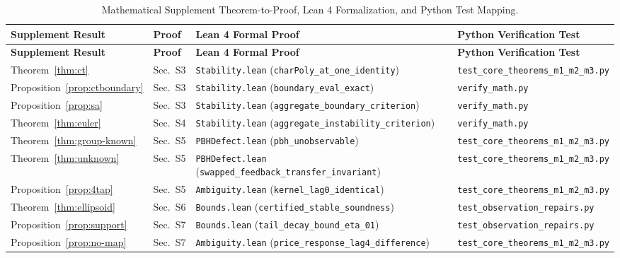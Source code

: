 \documentclass[11pt,a4paper]{article}
\theoremstyle{definition}\newtheorem{definition}[theorem]{Definition}
\theoremstyle{remark}\newtheorem{remark}[theorem]{Remark}
\begin{document}
\begingroup\setlength{\tabcolsep}{3pt}
\begin{longtable}{@{}>{\raggedright\arraybackslash}p{}>{\raggedright\arraybackslash}p{}>{\raggedright\arraybackslash\footnotesize}p{}>{\raggedright\arraybackslash\footnotesize}p{}@{}}
\caption{Mathematical Supplement Theorem-to-Proof, Lean 4 Formalization, and Python Test Mapping.}\label{tab:supp_claim_map}\\
\toprule
\textbf{Supplement Result} & \textbf{Proof} & \textbf{Lean 4 Formal Proof} & \textbf{Python Verification Test} \\\midrule\endfirsthead
\toprule
\textbf{Supplement Result} & \textbf{Proof} & \textbf{Lean 4 Formal Proof} & \textbf{Python Verification Test} \\\midrule\endhead
Theorem~\ref{thm:ct} & Sec.~S3 & \nolinkurl{Stability.lean} (\nolinkurl{charPoly_at_one_identity}) & \nolinkurl{test_core_theorems_m1_m2_m3.py} \\
Proposition~\ref{prop:ctboundary} & Sec.~S3 & \nolinkurl{Stability.lean} (\nolinkurl{boundary_eval_exact}) & \nolinkurl{verify_math.py} \\
Proposition~\ref{prop:sa} & Sec.~S3 & \nolinkurl{Stability.lean} (\nolinkurl{aggregate_boundary_criterion}) & \nolinkurl{verify_math.py} \\
Theorem~\ref{thm:euler} & Sec.~S4 & \nolinkurl{Stability.lean} (\nolinkurl{aggregate_instability_criterion}) & \nolinkurl{verify_math.py} \\
Theorem~\ref{thm:group-known} & Sec.~S5 & \nolinkurl{PBHDefect.lean} (\nolinkurl{pbh_unobservable}) & \nolinkurl{test_core_theorems_m1_m2_m3.py} \\
Theorem~\ref{thm:unknown} & Sec.~S5 & \nolinkurl{PBHDefect.lean} (\nolinkurl{swapped_feedback_transfer_invariant}) & \nolinkurl{test_core_theorems_m1_m2_m3.py} \\
Proposition~\ref{prop:4tap} & Sec.~S5 & \nolinkurl{Ambiguity.lean} (\nolinkurl{kernel_lag0_identical}) & \nolinkurl{test_core_theorems_m1_m2_m3.py} \\
Theorem~\ref{thm:ellipsoid} & Sec.~S6 & \nolinkurl{Bounds.lean} (\nolinkurl{certified_stable_soundness}) & \nolinkurl{test_observation_repairs.py} \\
Proposition~\ref{prop:support} & Sec.~S7 & \nolinkurl{Bounds.lean} (\nolinkurl{tail_decay_bound_eta_01}) & \nolinkurl{test_observation_repairs.py} \\
Proposition~\ref{prop:no-map} & Sec.~S7 & \nolinkurl{Ambiguity.lean} (\nolinkurl{price_response_lag4_difference}) & \nolinkurl{test_core_theorems_m1_m2_m3.py} \\

\end{longtable}
\end{document}
